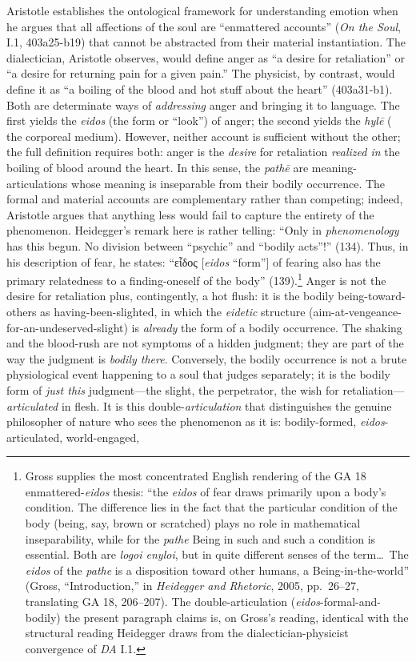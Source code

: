 \documentclass{article}
\newcommand{\gk}[1]{{\greekfont #1}}
\begin{document}
Aristotle  establishes the ontological framework for understanding emotion when he argues that all affections of the soul are ``enmattered accounts'' (\textit{On the Soul}, I.1, 403a25-b19) that cannot be abstracted from their material instantiation. The dialectician, Aristotle observes, would define anger as ``a desire for retaliation'' or ``a desire for returning pain for a given pain.'' The physicist, by contrast, would define it as ``a boiling of the blood and hot stuff about the heart'' (403a31-b1). Both are determinate ways of \textit{addressing} anger and bringing it to language. The first yields the \textit{eidos} (the form or ``look'') of anger; the second yields the \textit{hylē} ( the corporeal medium). However, neither account is sufficient without the other; the full definition requires both: anger is the \textit{desire} for retaliation \textit{realized in} the boiling of blood around the heart. In this sense, the \textit{pathē} are meaning-articulations whose meaning is inseparable from their bodily occurrence. The formal and material accounts are complementary rather than competing; indeed, Aristotle argues that anything less would fail to capture the entirety of the phenomenon. Heidegger's remark here is rather telling: ``Only in \textit{phenomenology} has this begun. No division between ``psychic'' and ``bodily acts''!'' (134). Thus, in his description of fear, he states: ``\gk{εἶδος} [\textit{eidos} ``form''] of fearing also has the primary relatedness to a finding-oneself of the body'' (139).\footnote{Gross supplies the most concentrated English rendering of the GA 18 enmattered-\textit{eidos} thesis: ``the \textit{eidos} of fear draws primarily upon a body's condition. The difference lies in the fact that the particular condition of the body (being, say, brown or scratched) plays no role in mathematical inseparability, while for the \textit{pathe} Being in such and such a condition is essential. Both are \textit{logoi enyloi}, but in quite different senses of the term\ldots\ The \textit{eidos} of the \textit{pathe} is a disposition toward other humans, a Being-in-the-world'' (Gross, ``Introduction,'' in \textit{Heidegger and Rhetoric}, 2005, pp.~26--27, translating GA 18, 206--207). The double-articulation (\textit{eidos}-formal-and-bodily) the present paragraph claims is, on Gross's reading, identical with the structural reading Heidegger draws from the dialectician-physicist convergence of \textit{DA} I.1.} Anger is not the desire for retaliation plus, contingently, a hot flush: it is the bodily being-toward-others as having-been-slighted, in which the \textit{eidetic} structure (aim-at-vengeance-for-an-undeserved-slight) is \textit{already} the form of a bodily occurrence. The shaking and the blood-rush are not symptoms of a hidden judgment; they are part of the way the judgment is \textit{bodily there}. Conversely, the bodily occurrence is not a brute physiological event happening to a soul that judges separately; it is the bodily form of \textit{just this} judgment---the slight, the perpetrator, the wish for retaliation---\textit{articulated} in flesh. It is this double-\textit{articulation} that distinguishes the genuine philosopher of nature who sees the phenomenon as it is: bodily-formed, \textit{eidos}-articulated, world-engaged, 
\end{document}
